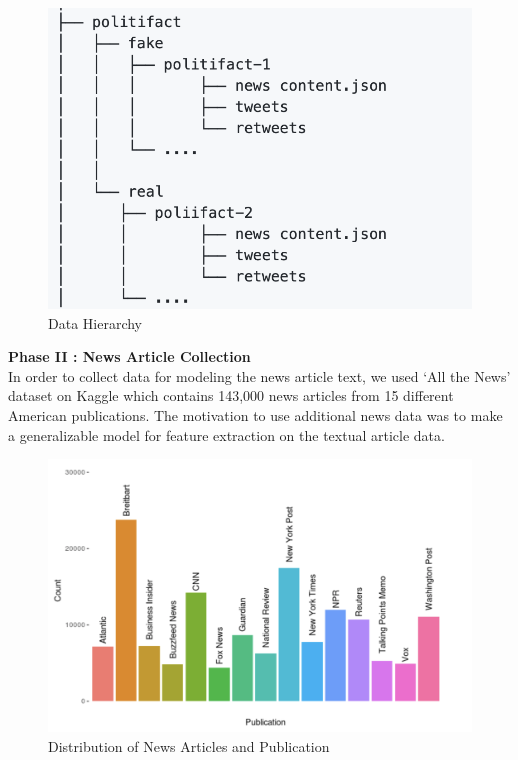 \documentclass{article}
\begin{document}
\begin{figure}[H]
    \centering
    \includegraphics[scale=0.5]{NeuRIPS2019/fakenews.png}
    \caption{Data Hierarchy}
    \label{Data Hierarchy}
\end{figure}
\textbf{Phase II : News Article Collection}\\
In order to collect data for modeling the news article text, we used ‘All the News’ dataset on Kaggle which contains 143,000 news articles from 15 different American publications. 
The motivation to use additional news data was to make a generalizable model for feature extraction on the textual article data.

\begin{figure}[H]
    \centering
    \includegraphics[scale=0.5]{NeuRIPS2019/all-the-news.png}
    \caption{Distribution of News Articles and Publication}
    \label{Distribution of News Articles and Publication}
\end{figure}
\end{document}
